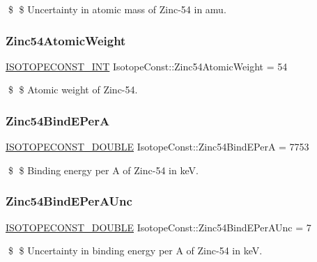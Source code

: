 \$ \$ Uncertainty in atomic mass of Zinc-\/54 in amu. \mbox{\label{group___isotope_const-_zinc-_zn54_gac24f53316cc5e5686bca20295b6c46f5}} 
\subsubsection{\texorpdfstring{Zinc54\+Atomic\+Weight}{Zinc54AtomicWeight}}
{\footnotesize\ttfamily \mbox{\hyperlink{group___isotope_const-_macros_ga5f18360b3e99483a35c32d789e62621c}{I\+S\+O\+T\+O\+P\+E\+C\+O\+N\+S\+T\+\_\+\+I\+NT}} Isotope\+Const\+::\+Zinc54\+Atomic\+Weight = 54}

\$ \$ Atomic weight of Zinc-\/54. \mbox{\label{group___isotope_const-_zinc-_zn54_gac68ae2aba6eb81b8dccc30a0cdffb3f1}} 
\subsubsection{\texorpdfstring{Zinc54\+Bind\+E\+PerA}{Zinc54BindEPerA}}
{\footnotesize\ttfamily \mbox{\hyperlink{group___isotope_const-_macros_ga8f45a7272ce02c0b4c65c44636ed719a}{I\+S\+O\+T\+O\+P\+E\+C\+O\+N\+S\+T\+\_\+\+D\+O\+U\+B\+LE}} Isotope\+Const\+::\+Zinc54\+Bind\+E\+PerA = 7753}

\$ \$ Binding energy per A of Zinc-\/54 in keV. \mbox{\label{group___isotope_const-_zinc-_zn54_ga16a9202cebc01ff80bea51c262c75ced}} 
\subsubsection{\texorpdfstring{Zinc54\+Bind\+E\+Per\+A\+Unc}{Zinc54BindEPerAUnc}}
{\footnotesize\ttfamily \mbox{\hyperlink{group___isotope_const-_macros_ga8f45a7272ce02c0b4c65c44636ed719a}{I\+S\+O\+T\+O\+P\+E\+C\+O\+N\+S\+T\+\_\+\+D\+O\+U\+B\+LE}} Isotope\+Const\+::\+Zinc54\+Bind\+E\+Per\+A\+Unc = 7}

\$ \$ Uncertainty in binding energy per A of Zinc-\/54 in keV. \mbox{\label{group___isotope_const-_zinc-_zn54_gafe8be1cf16f22a9011cd873ec8e372c8}} 
